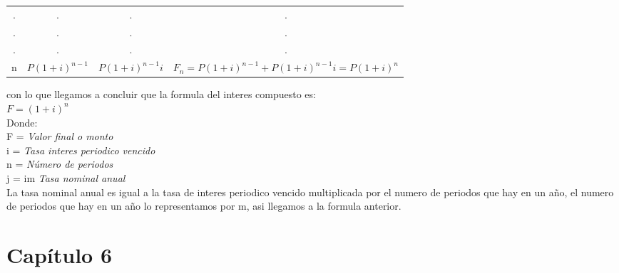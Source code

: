 \begin{spacing}{1.5}
\begin{table}[H]
\begin{tabular}{@{}|c|c|c|c|@{}}
   .                                  & .                                  & .                                  & .                                              \\
   .                                  & .                                  & .                                  & .                                              \\
   .                                  & .                                  & .                                  & .                                              \\
   n                                  & $P(1+i)^{n-1}$                     & $P(1+i)^{n-1}i$                    & $F_n = P(1+i)^{n-1}+P(1+i)^{n-1}i=P(1+i)^{n} $ \\ \bottomrule
  \end{tabular}
 \end{table}

 con lo que llegamos a concluir que la formula del interes compuesto es:\\
 $F = (1+i)^n$\\
 Donde:
 \\
 F = \hspace{32pt}  \textit{Valor final o monto}\\
 i = \hspace{35pt}  \textit{Tasa interes periodico vencido} \\
 n = \hspace{34pt}  \textit{Número  de periodos}\\   %
 j = im \hspace{23pt}  \textit{Tasa nominal anual}\\
 La tasa nominal anual es igual a la tasa de interes periodico vencido multiplicada por el numero de periodos que hay en un año, el numero de periodos que hay en un año lo representamos por m, asi llegamos a la formula anterior.\\


\end{spacing}

\section{Capítulo 6}

